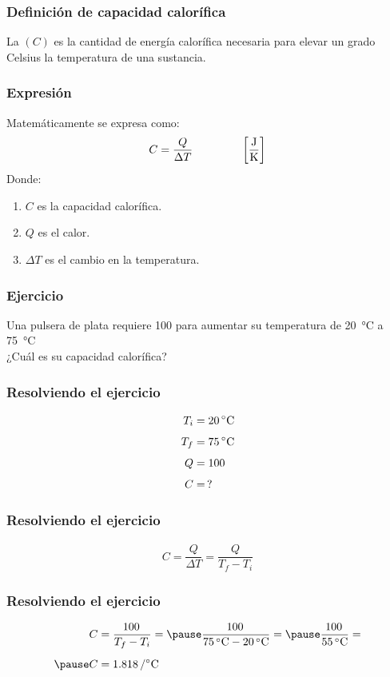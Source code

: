 \documentclass[14pt]{beamer}
\begin{document}
\begin{frame}
\frametitle{Definición de capacidad calorífica}
La  $(C)$ es la cantidad de energía calorífica necesaria para elevar un grado Celsius la temperatura de una sustancia.
\end{frame}
\begin{frame}
\frametitle{Expresión}
Matemáticamente se expresa como:
\pause
\begin{align*}
C = \dfrac{Q}{\Delta T} \hspace*{1.5cm} \left[ \dfrac{\unit{\joule}}{\unit{\kelvin}} \right]
\end{align*}
Donde:
\begin{enumerate}[<+->]
\item $C$ es la capacidad calorífica.
\item $Q$ es el calor.
\item $\Delta T$ es el cambio en la temperatura.
\end{enumerate}
\end{frame}
\begin{frame}
\frametitle{Ejercicio}
Una pulsera de plata requiere \SI{100}{\cal} para aumentar su temperatura de \SI{20}{\degreeCelsius} a \SI{75}{\degreeCelsius}
\\
\bigskip
\pause
¿Cuál es su capacidad calorífica?
\end{frame}
\begin{frame}
\frametitle{Resolviendo el ejercicio}
\begin{align*}
T_{i} &= \SI{20}{\degreeCelsius} \\[0.4em]
T_{f} &= \SI{75}{\degreeCelsius} \\[0.4em]
Q &= \SI{100}{\cal} \\[0.4em]
C &= \, ?
\end{align*}
\end{frame}
\begin{frame}
\frametitle{Resolviendo el ejercicio}
\begin{align*}
C = \dfrac{Q}{\Delta T} = \dfrac{Q}{T_{f} - T_{i}}
\end{align*}
\end{frame}
\begin{frame}
\frametitle{Resolviendo el ejercicio}
\begin{eqnarray*}
\begin{aligned}
C &= \dfrac{\SI{100}{\cal}}{T_{f} - T_{i}} = \pause \dfrac{\SI{100}{\cal}}{\SI{75}{\degreeCelsius} - \SI{20}{\degreeCelsius}} = \pause \dfrac{\SI{100}{\cal}}{\SI{55}{\degreeCelsius}} = \\[0.5em] \pause
C &= \SI{1.818}{\cal\per\degreeCelsius}
\end{aligned}
\end{eqnarray*}
\end{frame}
\end{document}
